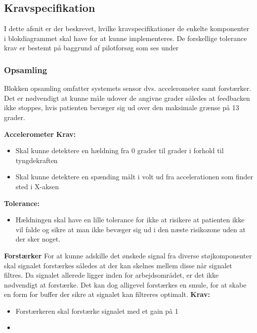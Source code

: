 \subsection{Kravspecifikation}
I dette afsnit er der beskrevet, hvilke kravspecifikationer de enkelte komponenter i blokdiagrammet skal have for at kunne implementeres. De forskellige tolerance krav er bestemt på baggrund af pilotforsøg som ses under 

\subsubsection{Opsamling}
Blokken opsamling omfatter systemets sensor dvs. accelerometer samt forstærker. Det er nødvendigt at kunne måle udover de angivne grader således at feedbacken ikke stoppes, hvis patienten bevæger sig ud over den maksimale grænse på 13 grader.

\textbf{Accelerometer}
\textbf{Krav:}
\begin{itemize}
\item Skal kunne detektere en hældning fra 0 grader til  grader i forhold til tyngdekraften
\item Skal kunne detektere en spænding målt i volt ud fra accelerationen som finder sted i X-aksen
\end{itemize}

\textbf{Tolerance:}
\begin{itemize}
Tolerance krav vil blive beskrevet på baggrund af pilotforsøg.
\item Hældningen skal have en lille tolerance for ikke at risikere at patienten ikke vil falde og sikre at man ikke bevæger sig ud i den næste risikozone uden at der sker noget.
\end{itemize}

\textbf{Forstærker}
For at kunne adskille det ønskede signal fra diverse støjkomponenter skal signalet forstærkes således at der kan skelnes mellem disse når signalet filtres. Da signalet allerede ligger inden for arbejdsområdet, er det ikke nødvendigt at forstærke. Det kan dog alligevel forstærkes en smule, for at skabe en form for buffer der sikre at signalet kan filtreres optimalt. 
\textbf{Krav:}
\begin{itemize}
\item Forstærkeren skal forstærke signalet med et gain på 1
\item 
\end{itemize}

